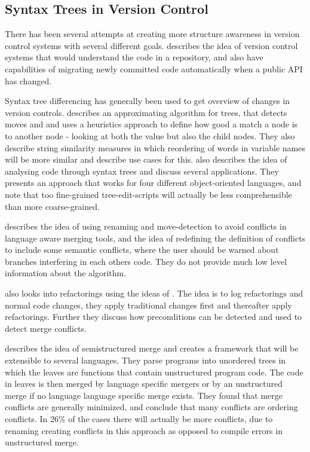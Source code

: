 \documentclass[11pt]{article}
\begin{document}
\subsection{Syntax Trees in Version Control}
There has been several attempts at creating more structure awareness in version control systems with several different goals. \citet{Freese} describes the idea of version control systems that would understand the code in a repository, and also have capabilities of migrating newly committed code automatically when a public API has changed.

Syntax tree differencing has generally been used to get overview of changes in version controls. \citet{Fluri} describes an approximating algorithm for trees, that  detects moves and and uses a heuristics approach to define how good a match a node is to another node - looking at both the value but also the child nodes. They also describe string similarity measures in which reordering of words in variable names will be more similar and describe use cases for this. \citet{Hashimoto} also describes the idea of analysing code through syntax trees and discuss several applications. They presents an approach that works for four different object-oriented languages, and note that too fine-grained tree-edit-scripts will actually be less comprehensible than more coarse-grained.

\citet{Hunt} describes the idea of using renaming and move-detection to avoid conflicts in language aware merging tools, and the idea of redefining the definition of conflicts to include some semantic conflicts, where the user should be warned about branches interfering in each others code. They do not provide much low level information about the algorithm.

\citet{Ekman} also looks into refactorings using the ideas of \citet{Lippe}. The idea is to log refactorings and normal code changes, they apply traditional changes first and thereafter apply refactorings. Further they discuss how preconditions can be detected and used to detect merge conflicts.

\citet{Apel} describes the idea of semistructured merge and creates a framework that will be extensible to several languages. They parse programs into unordered trees in which the leaves are functions that contain unstructured program code. The code in leaves is then merged by language specific mergers or by an unstructured merge if no language language specific merge exists. They found that merge conflicts are generally minimized, and conclude that many conflicts are ordering conflicts. In 26\% of the cases there will actually be more conflicts, due to renaming creating conflicts in this approach as opposed to compile errors in unstructured merge.
\end{document}

